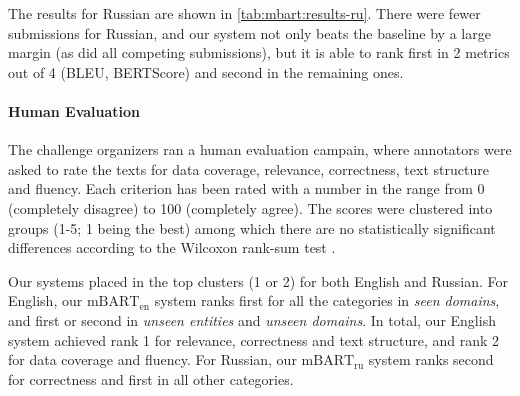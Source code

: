 The results for Russian are shown in \autoref{tab:mbart:results-ru}. There were fewer submissions for Russian, and our system not only beats the baseline by a large margin (as did all competing submissions), but it is able to rank first in 2 metrics out of 4 (BLEU, BERTScore) and second in the remaining ones.

\paragraph{Human Evaluation}

The challenge organizers ran a human evaluation campain, where annotators were asked to rate the texts for data coverage, relevance, correctness, text structure and fluency.  Each criterion has been rated with a number in the range from 0 (completely disagree) to 100 (completely agree). The scores were clustered into groups (1-5; 1 being the best) among which there are no statistically significant differences according to the Wilcoxon rank-sum test \citep{wilcoxon1992individual}.

Our systems placed in the top clusters (1 or 2) for both English and Russian. For English, our $\text{mBART}_{\text{en}}$ system ranks first for all the categories in \textit{seen domains}, and first or second in \textit{unseen entities} and \textit{unseen domains}. In total, our English system achieved rank 1 for relevance, correctness and text structure, and rank 2 for data coverage and fluency. For Russian, our $\text{mBART}_{\text{ru}}$ system ranks second for correctness and first in all other categories.


